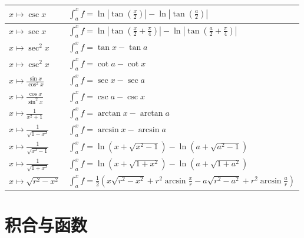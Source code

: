 \documentclass[12pt,UTF8,fontset=none]{ctexbook}
\begin{document}
\begin{appendix}
\begin{center}
\begin{longtable}{|l|l|}
        \hline    
        $\displaystyle x\mapsto \csc{x}$ & $\displaystyle \int_a^x f = \ln{\left|\tan{\left(\frac{x}{2}\right)}\right|} - \ln{\left|\tan{\left(\frac{a}{2}\right)}\right|}$ \\[4pt]
        \hline    
        $\displaystyle x\mapsto \sec{x}$ & $\displaystyle \int_a^x f = \ln{\left|\tan{\left(\frac{x}{2} + \frac{\pi}{4}\right)}\right|} - \ln{\left|\tan{\left(\frac{a}{2} + \frac{\pi}{4}\right)}\right|}$ \\[4pt]
        \hline    
        $\displaystyle x\mapsto \sec^2{x}$ & $\displaystyle \int_a^x f = \tan{x} - \tan{a}$ \\[4pt]
        \hline    
        $\displaystyle x\mapsto \csc^2{x}$ & $\displaystyle \int_a^x f = \cot{a} - \cot{x}$ \\[4pt]
        \hline    
        $\displaystyle x\mapsto \frac{\sin{x}}{\cos^2{x}}$ & $\displaystyle \int_a^x f = \sec{x} - \sec{a}$ \\[4pt]
        \hline    
        $\displaystyle x\mapsto \frac{\cos{x}}{\sin^2{x}}$ & $\displaystyle \int_a^x f = \csc{a} - \csc{x}$ \\[4pt]
        \hline    
        $\displaystyle x\mapsto \frac{1}{x^2 + 1}$ & $\displaystyle \int_a^x f = \arctan{x} - \arctan{a}$ \\[4pt]
        \hline    
        $\displaystyle x\mapsto \frac{1}{\sqrt{1 - x^2}}$ & $\displaystyle \int_a^x f = \arcsin{x} - \arcsin{a}$ \\[4pt]
        \hline    
        $\displaystyle x\mapsto \frac{1}{\sqrt{x^2 - 1}}$ & $\displaystyle \int_a^x f = \ln{\left(x + \sqrt{x^2 - 1}\right)} - \ln{\left(a + \sqrt{a^2 - 1}\right)}$ \\[4pt]
        \hline    
        $\displaystyle x\mapsto \frac{1}{\sqrt{1 + x^2}}$ & $\displaystyle \int_a^x f = \ln{\left(x + \sqrt{1 + x^2}\right)} - \ln{\left(a + \sqrt{1 + a^2}\right)}$ \\[4pt]
        \hline    
        $\displaystyle x\mapsto \sqrt{r^2 - x^2}$ & $\displaystyle \int_a^x f = \frac{1}{2}\left(x\sqrt{r^2 - x^2} + r^2\arcsin{\frac{x}{r}} - a\sqrt{r^2 - a^2} + r^2\arcsin{\frac{a}{r}}\right)$ \\[4pt]
        \hline
    \end{longtable}
\end{center}

\section{积合与函数}


\end{appendix}
\end{document}
